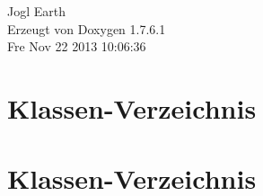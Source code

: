 \documentclass[a4paper]{book}
\begin{document}
\begin{titlepage}
\vspace*{7cm}
\begin{center}
{\Large \-Jogl \-Earth }\\
\vspace*{1cm}
{\large \-Erzeugt von Doxygen 1.7.6.1}\\
\vspace*{0.5cm}
{\small Fre Nov 22 2013 10:06:36}\\
\end{center}
\end{titlepage}
\clearemptydoublepage
{}
\tableofcontents
\clearemptydoublepage
{}
\chapter{\-Klassen-\/\-Verzeichnis}

\chapter{\-Klassen-\/\-Verzeichnis}

\end{document}
